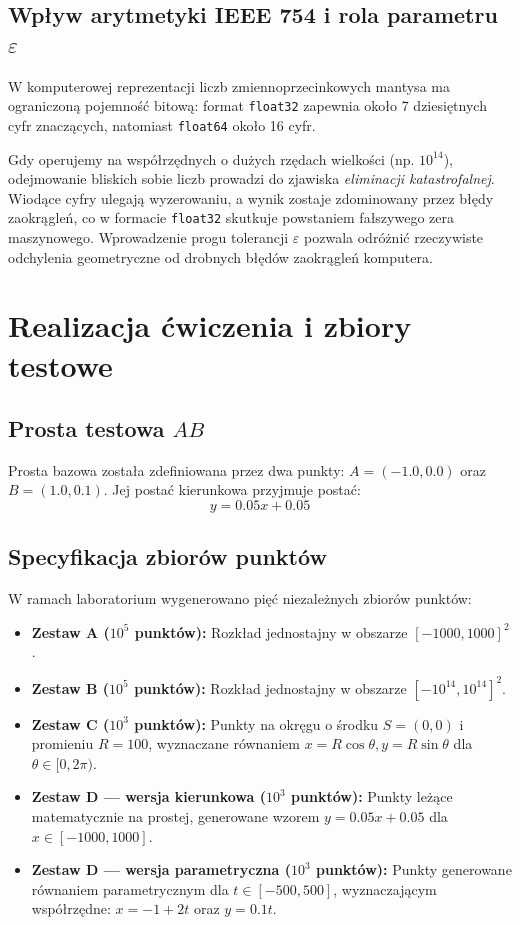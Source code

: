 \documentclass[10pt,a4paper]{article}
\begin{document}
\subsection{Wpływ arytmetyki IEEE 754 i rola parametru $\varepsilon$}
W komputerowej reprezentacji liczb zmiennoprzecinkowych mantysa ma ograniczoną pojemność bitową: format \texttt{float32} zapewnia około 7 dziesiętnych cyfr znaczących, natomiast \texttt{float64} około 16 cyfr.

Gdy operujemy na współrzędnych o dużych rzędach wielkości (np. $10^{14}$), odejmowanie bliskich sobie liczb prowadzi do zjawiska \emph{eliminacji katastrofalnej}. Wiodące cyfry ulegają wyzerowaniu, a wynik zostaje zdominowany przez błędy zaokrągleń, co w formacie \texttt{float32} skutkuje powstaniem fałszywego zera maszynowego. Wprowadzenie progu tolerancji $\varepsilon$ pozwala odróżnić rzeczywiste odchylenia geometryczne od drobnych błędów zaokrągleń komputera.

\newpage

\section{Realizacja ćwiczenia i zbiory testowe}

\subsection{Prosta testowa $AB$}
Prosta bazowa została zdefiniowana przez dwa punkty: $A = (-1.0, 0.0)$ oraz $B = (1.0, 0.1)$. Jej postać kierunkowa przyjmuje postać:
\begin{equation}
y = 0.05x + 0.05
\end{equation}

\subsection{Specyfikacja zbiorów punktów}
W ramach laboratorium wygenerowano pięć niezależnych zbiorów punktów:
\begin{itemize}
    \item \textbf{Zestaw A ($10^5$ punktów):} Rozkład jednostajny w obszarze $[-1000, 1000]^2$.
    \item \textbf{Zestaw B ($10^5$ punktów):} Rozkład jednostajny w obszarze $[-10^{14}, 10^{14}]^2$.
    \item \textbf{Zestaw C ($10^3$ punktów):} Punkty na okręgu o środku $S=(0,0)$ i promieniu $R=100$, wyznaczane równaniem $x = R\cos\theta, y = R\sin\theta$ dla $\theta \in [0, 2\pi)$.
    \item \textbf{Zestaw D --- wersja kierunkowa ($10^3$ punktów):} Punkty leżące matematycznie na prostej, generowane wzorem $y = 0.05x + 0.05$ dla $x \in [-1000, 1000]$.
    \item \textbf{Zestaw D --- wersja parametryczna ($10^3$ punktów):} Punkty generowane równaniem parametrycznym dla $t \in [-500, 500]$, wyznaczającym współrzędne: $x = -1 + 2t$ oraz $y = 0.1t$.
\end{itemize}
\end{document}
